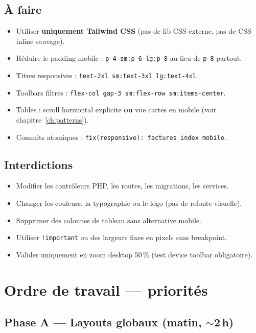\documentclass[11pt,a4paper]{report}
\begin{document}
\section{À faire}

\begin{itemize}[leftmargin=1.5em]
    \item Utiliser \textbf{uniquement Tailwind CSS} (pas de lib CSS externe, pas de CSS inline sauvage).
    \item Réduire le padding mobile : \texttt{p-4 sm:p-6 lg:p-8} au lieu de \texttt{p-8} partout.
    \item Titres responsives : \texttt{text-2xl sm:text-3xl lg:text-4xl}.
    \item Toolbars filtres : \texttt{flex-col gap-3 sm:flex-row sm:items-center}.
    \item Tables : scroll horizontal explicite \textbf{ou} vue cartes en mobile (voir chapitre~\ref{ch:patterns}).
    \item Commits atomiques : \texttt{fix(responsive): factures index mobile}.
\end{itemize}

\section{Interdictions}

\begin{itemize}[leftmargin=1.5em]
    \item Modifier les contrôleurs PHP, les routes, les migrations, les services.
    \item Changer les couleurs, la typographie ou le logo (pas de refonte visuelle).
    \item Supprimer des colonnes de tableau sans alternative mobile.
    \item Utiliser \texttt{!important} ou des largeurs fixes en pixels sans breakpoint.
    \item Valider uniquement en zoom desktop 50\,\% (test device toolbar obligatoire).
\end{itemize}

\chapter{Ordre de travail — priorités}
\label{ch:priorites}

\section{Phase A — Layouts globaux (matin, $\sim$2\,h)}
\end{document}

